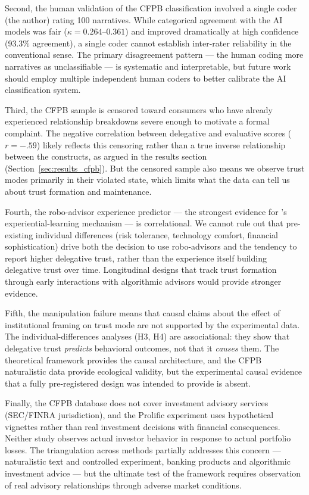 Second, the human validation of the CFPB classification involved a single coder (the author) rating 100 narratives. While categorical agreement with the AI models was fair ($\kappa = 0.264$--$0.361$) and improved dramatically at high confidence (93.3\% agreement), a single coder cannot establish inter-rater reliability in the conventional sense. The primary disagreement pattern --- the human coding more narratives as unclassifiable --- is systematic and interpretable, but future work should employ multiple independent human coders to better calibrate the AI classification system.

Third, the CFPB sample is censored toward consumers who have already experienced relationship breakdowns severe enough to motivate a formal complaint. The negative correlation between delegative and evaluative scores ($r = -.59$) likely reflects this censoring rather than a true inverse relationship between the constructs, as argued in the results section (Section~\ref{sec:results_cfpb}). But the censored sample also means we observe trust modes primarily in their violated state, which limits what the data can tell us about trust formation and maintenance.

Fourth, the robo-advisor experience predictor --- the strongest evidence for \citeauthor{hardin1993street}'s experiential-learn\-ing mechanism --- is correlational. We cannot rule out that pre-existing individual differences (risk tolerance, technology comfort, financial sophistication) drive both the decision to use robo-advisors and the tendency to report higher delegative trust, rather than the experience itself building delegative trust over time. Longitudinal designs that track trust formation through early interactions with algorithmic advisors would provide stronger evidence.

Fifth, the manipulation failure means that causal claims about the effect of institutional framing on trust mode are not supported by the experimental data. The individual-differences analyses (H3, H4) are associational: they show that delegative trust \emph{predicts} behavioral outcomes, not that it \emph{causes} them. The theoretical framework provides the causal architecture, and the CFPB naturalistic data provide ecological validity, but the experimental causal evidence that a fully pre-registered design was intended to provide is absent.

Finally, the CFPB database does not cover investment advisory services (SEC/FINRA jurisdiction), and the Prolific experiment uses hypothetical vignettes rather than real investment decisions with financial consequences. Neither study observes actual investor behavior in response to actual portfolio losses. The triangulation across methods partially addresses this concern --- naturalistic text and controlled experiment, banking products and algorithmic investment advice --- but the ultimate test of the framework requires observation of real advisory relationships through adverse market conditions.
